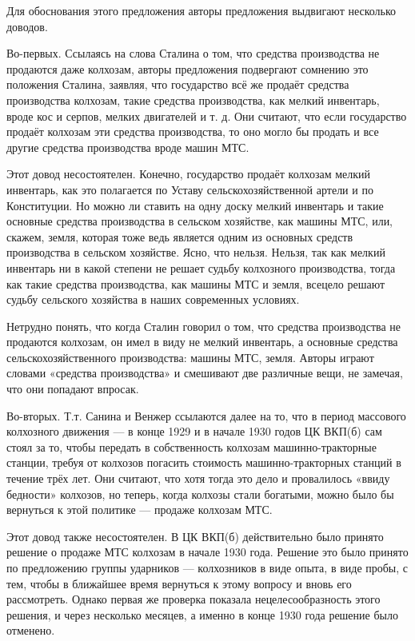 \documentclass[12pt, a4paper, openany]{book}
\begin{document}
Для обоснования этого предложения авторы предложения выдвигают несколько доводов.

Во-первых. Ссылаясь на слова Сталина о том, что средства производства не продаются даже колхозам, авторы предложения подвергают сомнению это положения Сталина, заявляя, что государство всё же продаёт средства производства колхозам, такие средства производства, как мелкий инвентарь, вроде кос и серпов, мелких двигателей и т. д. Они считают, что если государство продаёт колхозам эти средства производства, то оно могло бы продать и все другие средства производства вроде машин МТС.

Этот довод несостоятелен. Конечно, государство продаёт колхозам мелкий инвентарь, как это полагается по Уставу сельскохозяйственной артели и по Конституции. Но можно ли ставить на одну доску мелкий инвентарь и такие основные средства производства в сельском хозяйстве, как машины МТС, или, скажем, земля, которая тоже ведь является одним из основных средств производства в сельском хозяйстве. Ясно, что нельзя. Нельзя, так как мелкий инвентарь ни в какой степени не решает судьбу колхозного производства, тогда как такие средства производства, как машины МТС и земля, всецело решают судьбу сельского хозяйства в наших современных условиях.

Нетрудно понять, что когда Сталин говорил о том, что средства производства не продаются колхозам, он имел в виду не мелкий инвентарь, а основные средства сельскохозяйственного производства: машины МТС, земля. Авторы играют словами «средства производства» и смешивают две различные вещи, не замечая, что они попадают впросак.

Во-вторых. Т.т. Санина и Венжер ссылаются далее на то, что в период массового колхозного движения — в конце 1929 и в начале 1930 годов ЦК ВКП(б) сам стоял за то, чтобы передать в собственность колхозам машинно-тракторные станции, требуя от колхозов погасить стоимость машинно-тракторных станций в течение трёх лет. Они считают, что хотя тогда это дело и провалилось «ввиду бедности» колхозов, но теперь, когда колхозы стали богатыми, можно было бы вернуться к этой политике — продаже колхозам МТС.



Этот довод также несостоятелен. В ЦК ВКП(б) действительно было принято решение о продаже МТС колхозам в начале 1930 года. Решение это было принято по предложению группы ударников — колхозников в виде опыта, в виде пробы, с тем, чтобы в ближайшее время вернуться к этому вопросу и вновь его рассмотреть. Однако первая же проверка показала нецелесообразность этого решения, и через несколько месяцев, а именно в конце 1930 года решение было отменено.
\end{document}

